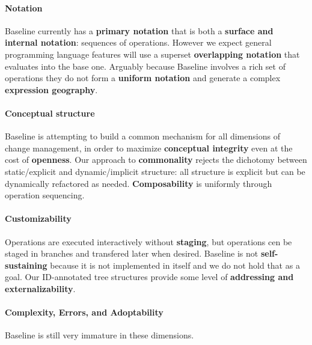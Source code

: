 \documentclass[english,submission]{programming}
\theoremstyle{definition}
\begin{document}
\paragraph{Notation} Baseline currently has a \textbf{primary notation} that is both a \textbf{surface and internal notation}: sequences of operations. However we expect general programming language features will use a superset \textbf{overlapping notation} that evaluates into the base one. Arguably because Baseline involves a rich set of operations they do not form a \textbf{uniform notation} and generate a complex \textbf{expression geography}.

\paragraph{Conceptual structure} Baseline is attempting to build a common mechanism for all dimensions of change management, in order to maximize \textbf{conceptual integrity} even at the cost of \textbf{openness}. Our approach to \textbf{commonality} rejects the  dichotomy between static/explicit and dynamic/implicit structure: all structure is explicit but can be dynamically refactored as needed. \textbf{Composability} is uniformly through operation sequencing.

\paragraph{Customizability} Operations are executed interactively without \textbf{staging}, but operations cen be staged in branches and transfered later when desired. Baseline is not \textbf{self-sustaining} because it is not implemented in itself and we do not hold that as a goal. Our ID-annotated tree structures provide some level of \textbf{addressing and externalizability}.

\paragraph{Complexity, Errors, and Adoptability} Baseline is still very immature in these dimensions.





\printbibliography
\end{document}

